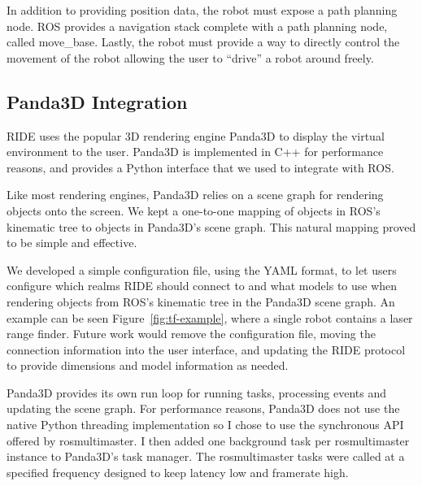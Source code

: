 In addition to providing position data, the robot must expose a path planning node. ROS provides a navigation stack complete with a path planning node, called move\_base. Lastly, the robot must provide a way to directly control the movement of the robot allowing the user to ``drive'' a robot around freely.


\subsection{Panda3D Integration}

RIDE uses the popular 3D rendering engine Panda3D to display the virtual environment to the user. Panda3D is implemented in C++ for performance reasons, and provides a Python interface that we used to integrate with ROS. 

Like most rendering engines, Panda3D relies on a scene graph for rendering objects onto the screen. We kept a one-to-one mapping of objects in ROS's kinematic tree to objects in Panda3D's scene graph. This natural mapping proved to be simple and effective.

We developed a simple configuration file, using the YAML format, to let users configure which realms RIDE should connect to and what models to use when rendering objects from ROS's kinematic tree in the Panda3D scene graph. An example can be seen Figure~\ref{fig:tf-example}, where a single robot contains a laser range finder. Future work would remove the configuration file, moving the connection information into the user interface, and updating the RIDE protocol to provide dimensions and model information as needed.


Panda3D provides its own run loop for running tasks, processing events and updating the scene graph. For performance reasons, Panda3D does not use the native Python threading implementation so I chose to use the synchronous API offered by rosmultimaster. I then added one background task per rosmultimaster instance to Panda3D's task manager. The rosmultimaster tasks were called at a specified frequency designed to keep latency low and framerate high.
